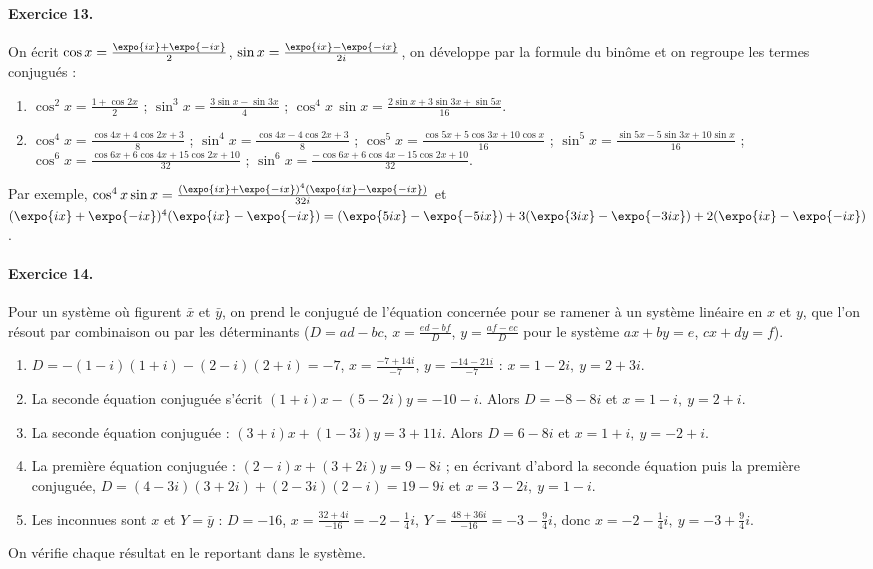 \begin{corrige}
\paragraph{Exercice 13.}
On \'ecrit $\cos x = \frac{\expo{ix} + \expo{-ix}}{2}$, $\sin x = \frac{\expo{ix} - \expo{-ix}}{2i}$, on d\'eveloppe par la formule du bin\^ome et on regroupe les termes conjugu\'es :
\begin{enumerate}
\item $\cos^2 x = \frac{1 + \cos 2x}{2}$ ; $\sin^3 x = \frac{3\sin x - \sin 3x}{4}$ ;
      $\cos^4 x\,\sin x = \frac{2\sin x + 3\sin 3x + \sin 5x}{16}$.
\item $\cos^4 x = \frac{\cos 4x + 4\cos 2x + 3}{8}$ ; $\sin^4 x = \frac{\cos 4x - 4\cos 2x + 3}{8}$ ;
      $\cos^5 x = \frac{\cos 5x + 5\cos 3x + 10\cos x}{16}$ ; $\sin^5 x = \frac{\sin 5x - 5\sin 3x + 10\sin x}{16}$ ;
      $\cos^6 x = \frac{\cos 6x + 6\cos 4x + 15\cos 2x + 10}{32}$ ; $\sin^6 x = \frac{-\cos 6x + 6\cos 4x - 15\cos 2x + 10}{32}$.
\end{enumerate}
Par exemple, $\cos^4 x\sin x = \frac{(\expo{ix} + \expo{-ix})^4(\expo{ix} - \expo{-ix})}{32i}$ et
$(\expo{ix} + \expo{-ix})^4(\expo{ix} - \expo{-ix}) = (\expo{5ix} - \expo{-5ix}) + 3(\expo{3ix} - \expo{-3ix}) + 2(\expo{ix} - \expo{-ix})$.

\paragraph{Exercice 14.}
Pour un syst\`eme o\`u figurent $\bar{x}$ et $\bar{y}$, on prend le conjugu\'e de l'\'equation concern\'ee
pour se ramener \`a un syst\`eme lin\'eaire en $x$ et $y$, que l'on r\'esout par combinaison ou par les d\'eterminants
($D = a d - b c$, $x = \frac{e d - b f}{D}$, $y = \frac{a f - e c}{D}$ pour le syst\`eme $ax + by = e$, $cx + dy = f$).
\begin{enumerate}
\item $D = -(1-i)(1+i) - (2-i)(2+i) = -7$, $x = \frac{-7 + 14i}{-7}$, $y = \frac{-14 - 21i}{-7}$ : $\boxed{x = 1 - 2i,\ y = 2 + 3i}$.
\item La seconde \'equation conjugu\'ee s'\'ecrit $(1+i)x - (5-2i)y = -10 - i$. Alors $D = -8 - 8i$ et $\boxed{x = 1 - i,\ y = 2 + i}$.
\item La seconde \'equation conjugu\'ee : $(3+i)x + (1-3i)y = 3 + 11i$. Alors $D = 6 - 8i$ et $\boxed{x = 1 + i,\ y = -2 + i}$.
\item La premi\`ere \'equation conjugu\'ee : $(2-i)x + (3+2i)y = 9 - 8i$ ; en \'ecrivant d'abord la seconde \'equation puis la premi\`ere conjugu\'ee, $D = (4-3i)(3+2i) + (2-3i)(2-i) = 19 - 9i$ et $\boxed{x = 3 - 2i,\ y = 1 - i}$.
\item Les inconnues sont $x$ et $Y = \bar{y}$ : $D = -16$, $x = \frac{32 + 4i}{-16} = -2 - \frac{1}{4}i$, $Y = \frac{48 + 36i}{-16} = -3 - \frac{9}{4}i$,
      donc $\boxed{x = -2 - \frac{1}{4}i,\ y = -3 + \frac{9}{4}i}$.
\end{enumerate}
On v\'erifie chaque r\'esultat en le reportant dans le syst\`eme.


\end{corrige}
